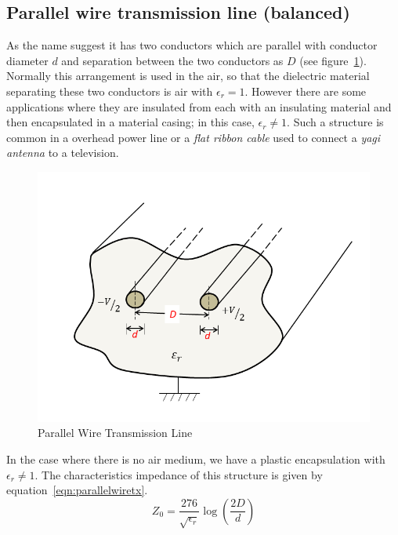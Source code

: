 \subsection{Parallel wire transmission line (balanced)} 
As the name suggest it has two conductors which are parallel with conductor diameter $d$ and separation between the two conductors as $D$ (see figure~\ref{fig:parallelwiretx}). Normally this arrangement is used in the air, so that the dielectric material separating these two conductors is air with $\epsilon_r=1$. However there are some applications where they are insulated from each with an insulating material and then encapsulated in a material casing; in this case, $\epsilon_r\neq1$. Such a structure is common in a overhead power line or a \emph{flat ribbon cable} used to connect a \emph{yagi antenna} to a television.
\begin{figure}[h]
\centering
\includegraphics[width=1\linewidth]{./graphics/parallelWireTX}
\caption{Parallel Wire Transmission Line}
\label{fig:parallelwiretx}
\end{figure}

In the case where there is no air medium, we have a plastic encapsulation with $\epsilon_r\neq1$. The characteristics impedance of this structure is given by equation~\ref{eqn:parallelwiretx}.
\begin{equation}
Z_0 =\dfrac{276}{\sqrt{\epsilon_r}}\log(\dfrac{2D}{d})
\label{eqn:parallelwiretx}
\end{equation}

